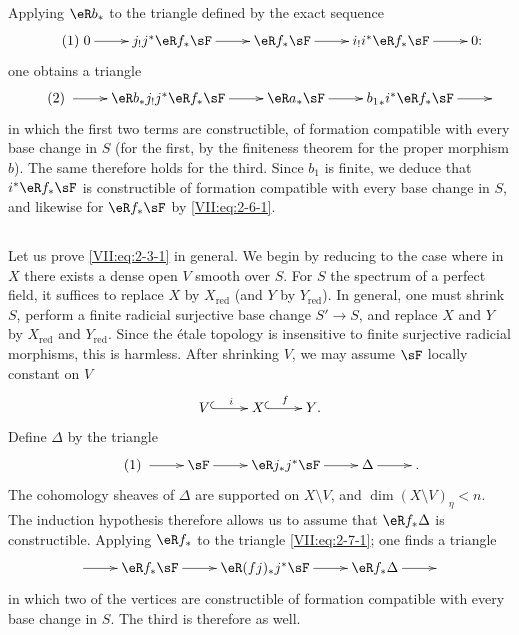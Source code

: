 Applying $\eR b_\ast$ to the triangle defined by the exact sequence
\begin{equation*}\tag{1}\label{VII:eq:2-6-1}
\xymatrix{
  0 \ar[r]
    & j_! j^\ast \eR f_\ast \sF \ar[r]
    & \eR f_\ast \sF \ar[r]
    & i_! i^\ast \eR f_\ast \sF \ar[r]
    & 0 \text{:}
}
\end{equation*}
one obtains a triangle
\begin{equation*}\tag{2}\label{VII:eq:2-6-2}
\xymatrix{
  \ar[r]
    & \eR b_\ast j_! j^\ast \eR f_\ast \sF \ar[r]
    & \eR a_\ast \sF \ar[r]
    & {b_1}_\ast i^\ast \eR f_\ast \sF \ar[r]
    &
}
\end{equation*}
in which the first two terms are constructible, of formation
compatible with every base change in $S$ (for the first, by the
finiteness theorem for the proper morphism $b$). The same therefore holds
for the third. Since $b_1$ is finite, we deduce that
$i^\ast \eR f_\ast \sF$ is constructible of formation compatible with every
base change in $S$, and likewise for $\eR f_\ast \sF$ by
\eqref{VII:eq:2-6-1}.




\subsection{}\label{VII:2-7}

Let us prove \eqref{VII:eq:2-3-1} in general. We begin by reducing to the case
where in $X$ there exists a dense open $V$ smooth over $S$. For $S$ the spectrum of a
perfect field, it suffices to replace $X$ by $X_\text{red}$ (and $Y$ by
$Y_\text{red}$). In general, one must shrink $S$, perform a finite radicial surjective base
change $S' \to S$, and replace $X$ and $Y$ by
$X_\text{red}$ and $Y_\text{red}$. Since the \'etale topology is insensitive to
finite surjective radicial morphisms, this is harmless. After
shrinking $V$, we may assume $\sF$ locally constant on $V$
\[\xymatrix{
  V \ar@{^{(}->}[r]^i
    & X \ar@{^{(}->}[r]^-f
    & Y \text{.}
}\]
Define $\Delta$ by the triangle
\begin{equation*}\tag{1}\label{VII:eq:2-7-1}
\xymatrix{
  \ar[r]
    & \sF \ar[r]
    & \eR j_\ast j^\ast \sF \ar[r]
    & \Delta \ar[r]
    & \text{.}
}
\end{equation*}
The cohomology sheaves of $\Delta$ are supported on $X\setminus V$,
and $\dim(X\setminus V)_\eta < n$. The induction hypothesis therefore allows us to
assume that $\eR f_\ast \Delta$ is constructible. Applying $\eR f_\ast$ to the
triangle \eqref{VII:eq:2-7-1}; one finds a triangle
\[\xymatrix{
  \ar[r]
    & \eR f_\ast \sF \ar[r]
    & \eR(f j)_\ast j^\ast \sF \ar[r]
    & \eR f_\ast \Delta \ar[r]
    &
}\]
in which two of the vertices are constructible of formation compatible with
every base change in $S$. The third is therefore as well.




